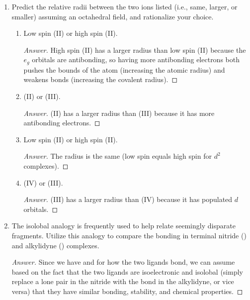 \documentclass[../psets.tex]{subfiles}
\begin{document}
\begin{enumerate}
\begin{enumerate}[label={\alph*)}]
\begin{proof}[Answer]
\begin{align*}
                    &= 3
            \end{align*}
        \end{proof}
    \end{enumerate}
    \item Predict the relative radii between the two ions listed (i.e., same, larger, or smaller) assuming an octahedral field, and rationalize your choice.
    \begin{enumerate}[label={\alph*)}]
        \item Low spin (II) or high spin (II).
        \begin{proof}[Answer]
            High spin (II) has a larger radius than low spin (II) because the $e_g$ orbitals are antibonding, so having more antibonding electrons both pushes the bounds of the atom (increasing the atomic radius) and weakens bonds (increasing the covalent radius).
        \end{proof}
        \item {}(II) or (III).
        \begin{proof}[Answer]
            (II) has a larger radius than (III) because it has more antibonding electrons.
        \end{proof}
        \item Low spin (II) or high spin (II).
        \begin{proof}[Answer]
            The radius is the same (low spin equals high spin for $d^2$ complexes).
        \end{proof}
        \item {}(IV) or (III).
        \begin{proof}[Answer]
            (III) has a larger radius than (IV) because it has populated $d$ orbitals.
        \end{proof}
    \end{enumerate}
    \item The isolobal analogy is frequently used to help relate seemingly disparate fragments. Utilize this analogy to compare the bonding in terminal nitride () and alkylidyne () complexes.
    \begin{proof}[Answer]
        Since we have \quad and  for how the two ligands bond, we can assume based on the fact that the two ligands are isoelectronic and isolobal (simply replace a lone pair in the nitride with the bond in the alkylidyne, or vice versa) that they have similar bonding, stability, and chemical properties.

\end{proof}
\end{enumerate}
\end{document}
